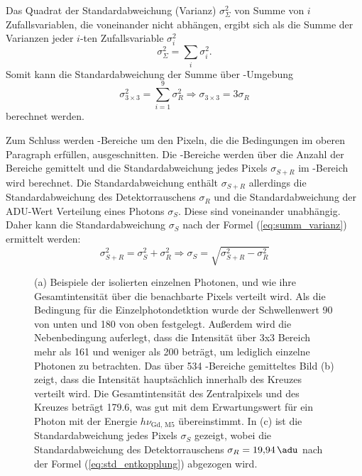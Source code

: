 \noindent
Das Quadrat der Standardabweichung (Varianz) $\sigma_\Sigma^2$ von Summe von $i$ Zufallsvariablen, die voneinander nicht abhängen, ergibt sich als die Summe der Varianzen jeder $i$-ten Zufallsvariable $\sigma_i^2$
\begin{equation}
    \sigma_\Sigma^2 = \sum_{i} \sigma_i^2.
    \label{eq:summ_varianz}
\end{equation}
\noindent
Somit kann die Standardabweichung der Summe über -Umgebung
\begin{equation}
    \sigma_{3\times 3}^2 = \sum_{i=1}^9\sigma_R^2 \Rightarrow \sigma_{3\times 3} = 3 \sigma_R
\end{equation}
berechnet werden.

\noindent
Zum Schluss werden -Bereiche um den Pixeln, die die Bedingungen im oberen Paragraph erfüllen, ausgeschnitten. Die -Bereiche werden über die Anzahl der Bereiche gemittelt und die Standardabweichung jedes Pixels $\sigma_{S+R}$ im -Bereich wird berechnet. Die Standardabweichung enthält $\sigma_{S+R}$ allerdings die Standardabweichung des Detektorrauschens $\sigma_{R}$ und die Standardabweichung der ADU-Wert Verteilung eines Photons $\sigma_{S}$. Diese sind voneinander unabhängig. Daher kann die Standardabweichung $\sigma_{S}$ nach der Formel (\ref{eq:summ_varianz}) ermittelt werden:
\begin{equation}
    \sigma_{S+R}^2 = \sigma_{S}^2 + \sigma_{R}^2 \Rightarrow \sigma_{S} = \sqrt{\sigma_{S+R}^2 - \sigma_{R}^2}
    \label{eq:std_entkopplung}
\end{equation}
\begin{figure}[H]
    \centering
    
    \caption{(a) Beispiele der isolierten einzelnen Photonen, und wie ihre Gesamtintensität über die benachbarte Pixels verteilt wird. Als die Bedingung für die Einzelphotondetktion wurde der Schwellenwert \SI{90}{\adu} von unten und \SI{180}{\adu} von oben festgelegt. Außerdem wird die Nebenbedingung auferlegt, dass die Intensität über 3x3 Bereich mehr als \SI{161}{\adu} und weniger als \SI{200}{\adu} beträgt, um lediglich einzelne Photonen zu betrachten. Das über 534 -Bereiche gemitteltes Bild (b) zeigt, dass die Intensität hauptsächlich innerhalb des Kreuzes verteilt wird. Die Gesamtintensität des Zentralpixels und des Kreuzes beträgt \SI{179.6}{\adu}, was gut mit dem Erwartungswert für ein Photon mit der Energie $h\nu_\text{Gd, M5}$ übereinstimmt. In (c) ist die Standardabweichung jedes Pixels $\sigma_{S}$ gezeigt, wobei die Standardabweichung des Detektorrauschens $\sigma_R = \SI{19.94}{\adu}$ nach der Formel (\ref{eq:std_entkopplung}) abgezogen wird.}
    \label{fig:examples_average_std_5x5_hotspot}
\end{figure}
